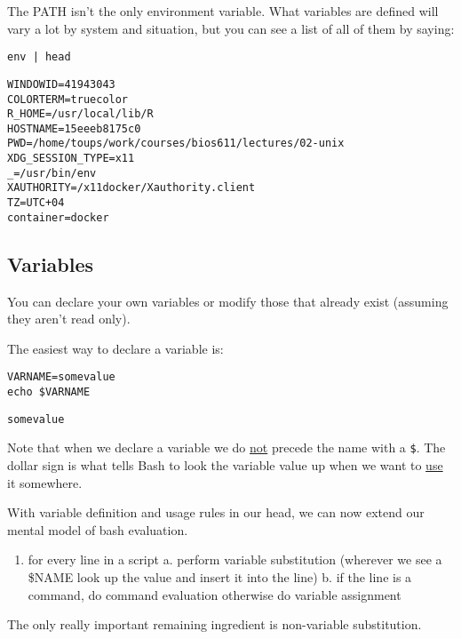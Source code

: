 \documentclass[11pt]{article}
\begin{document}
The PATH isn't the only environment variable. What variables are
defined will vary a lot by system and situation, but you can see a
list of all of them by saying:

\begin{verbatim}
env | head
\end{verbatim}

\begin{verbatim}
WINDOWID=41943043
COLORTERM=truecolor
R_HOME=/usr/local/lib/R
HOSTNAME=15eeeb8175c0
PWD=/home/toups/work/courses/bios611/lectures/02-unix
XDG_SESSION_TYPE=x11
_=/usr/bin/env
XAUTHORITY=/x11docker/Xauthority.client
TZ=UTC+04
container=docker
\end{verbatim}

\subsection{Variables}
\label{sec:orgd1e769e}

You can declare your own variables or modify those that already exist
(assuming they aren't read only).

The easiest way to declare a variable is:

\begin{verbatim}
VARNAME=somevalue
echo $VARNAME
\end{verbatim}

\begin{verbatim}
somevalue
\end{verbatim}

Note that when we declare a variable we do \uline{not} precede the name with
a \texttt{\$}. The dollar sign is what tells Bash to look the variable value
up when we want to \uline{use} it somewhere. 

With variable definition and usage rules in our head, we can now
extend our mental model of bash evaluation.

\begin{enumerate}
\item for every line in a script
a. perform variable substitution (wherever we see a \$NAME look up
the value and insert it into the line)
b. if the line is a command, do command evaluation
   otherwise do variable assignment
\end{enumerate}

The only really important remaining ingredient is non-variable
substitution.
\end{document}
